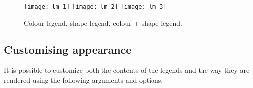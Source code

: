 \begin{figure}[htbp]
  \centering
  \texttt{[image: lm-1]}%
  \texttt{[image: lm-2]}%
  \texttt{[image: lm-3]}
  
  \caption{Colour legend, shape legend, colour + shape legend. }
  \label{fig:legend-merge}
\end{figure}

\subsection{Customising appearance}

It is possible to customize both the contents of the legends and the way they are rendered using the following arguments and options.

